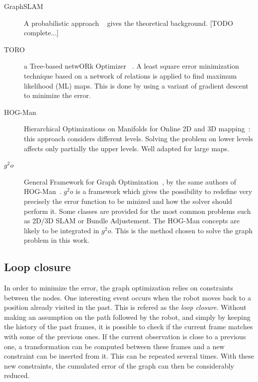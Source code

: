 \begin{description}
\item[GraphSLAM] A probabilistic approach ~\cite{Thrun_2005} gives the theoretical background. [TODO complete...]
\item[TORO] a Tree-based netwORk Optimizer ~\cite{grisetti07rss}. A least square error minimization technique based on a network of relations is applied to find maximum likelihood (ML) maps. This is done by using a variant of gradient descent to minimize the error.
\item[HOG-Man] Hierarchical Optimizations on Manifolds for Online 2D and 3D mapping~\cite{hogman_2010}: this approach considers different levels. Solving the problem on lower levels affects only partially the upper levels. Well adapted for large maps.
\item[$g^2o$] General Framework for Graph Optimization~\cite{g2o_2011}, by the same authors of HOG-Man~\cite{hogman_2010}. $g^2o$ is a framework which gives the possibility to redefine very precisely the error function to be minized and how the solver should perform it. Some classes are provided for the most common problems such as 2D/3D SLAM or Bundle Adjustement. The HOG-Man concepts are likely to be integrated in $g^2o$. This is the method chosen to solve the graph problem in this work.
\end{description}

\subsection{Loop closure}

In order to minimize the error, the graph optimization relies on constraints between the nodes. One interesting event occurs when the robot moves back to a position already visited in the past. This is refered as the \emph{loop closure}. Without making an assumption on the path followed by the robot, and simply by keeping the history of the past frames, it is possible to check if the current frame matches with some of the previous ones. If the current observation is close to a previous one, a transformation can be computed between these frames and a new constraint can be inserted from it. This can be repeated several times. With these new constraints, the cumulated error of the graph can then be considerably reduced. 

